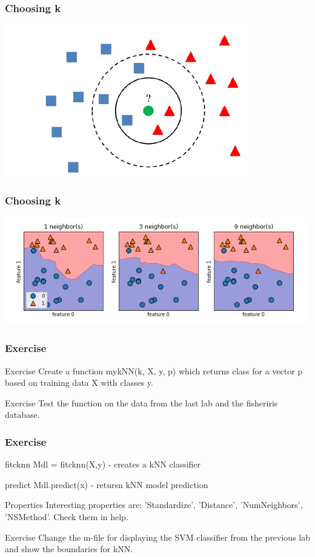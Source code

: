 \documentclass{beamer}
\begin{document}
\begin{frame}
\frametitle{Choosing k}
\center
\includegraphics[width=0.8\textwidth]{knn2.png}
\end{frame}

\begin{frame}
\frametitle{Choosing k}
\center
\includegraphics[width=1.1\textwidth]{knn.png}
\end{frame}


\begin{frame}
\frametitle{Exercise}
\begin{block}{Exercise}
Create a function mykNN(k, X, y, p) which returns class for a vector p based on training data X with classes y.
\end{block}

\begin{block}{Exercise}
Test the function on the data from the last lab and the fisheriris database.
\end{block}
\end{frame}

\begin{frame}
\frametitle{Exercise}
\begin{block}{fitcknn}
Mdl = fitcknn(X,y) - creates a kNN classifier
\end{block}

\begin{block}{predict}
Mdl.predict(x) - retursn kNN model prediction
\end{block}

\begin{block}{Properties}
Interesting properties are: 'Standardize', 'Distance', 'NumNeighbors', 'NSMethod'. Check them in help.
\end{block}

\begin{block}{Exercise}
Change the m-file for displaying the SVM classifier from the previous lab and show the boundaries for kNN.
\end{block}
\end{frame}
\end{document}
